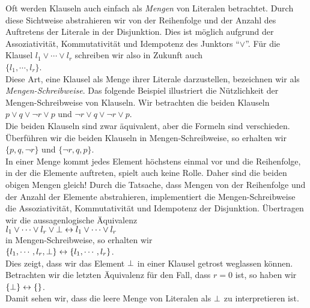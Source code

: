 Oft werden Klauseln auch einfach als \emph{\color{blue}Mengen} von Literalen betrachtet.  
Durch diese Sichtweise abstrahieren wir von der Reihenfolge und der Anzahl des Auftretens
der Literale in der Disjunktion.  Dies ist m\"{o}glich aufgrund der Assoziativit\"{a}t, Kommutativit\"{a}t und
Idempotenz des Junktors ``$\vee$''.  F\"{u}r die Klausel $l_1 \vee \cdots \vee l_r$ schreiben
wir also in Zukunft auch 
\\[0.2cm]
\hspace*{1.3cm} $\{ l_1, \cdots, l_r \}$.
\\[0.2cm]
Diese Art, eine Klausel als Menge ihrer Literale darzustellen, bezeichnen wir als
\emph{\color{blue}Mengen-Schreibweise}.  
Das folgende Beispiel illustriert die N\"{u}tzlichkeit der Mengen-Schreibweise von Klauseln.
Wir betrachten die beiden Klauseln
\\[0.2cm]
\hspace*{1.3cm}
$p \vee q \vee \neg r \vee p$ \quad und \quad $\neg r \vee q \vee \neg r \vee p$. 
\\[0.2cm]
Die beiden Klauseln sind zwar \"{a}quivalent, aber die Formeln sind verschieden.
\"{U}berf\"{u}hren wir die beiden Klauseln in Mengen-Schreibweise, so erhalten wir
\\[0.2cm]
\hspace*{1.3cm}
$\{p, q, \neg r \}$ \quad und \quad $\{ \neg r, q, p \}$. 
\\[0.2cm]
In einer Menge kommt jedes Element h\"{o}chstens einmal vor und die Reihenfolge, in der die
Elemente auftreten, spielt auch keine Rolle.  Daher sind die beiden obigen Mengen gleich!
Durch die Tatsache, dass Mengen von der Reihenfolge und der Anzahl der Elemente
abstrahieren, implementiert die Mengen-Schreibweise die Assoziativit\"{a}t, Kommutativit\"{a}t und
Idempotenz der Disjunktion.  \"{U}ber\-tragen wir die  aussagenlogische \"{A}quivalenz
\\[0.2cm]
\hspace*{1.3cm}
$l_1 \vee \cdots \vee l_r \vee \bot \leftrightarrow l_1 \vee \cdots \vee l_r$
\\[0.2cm]
in Mengen-Schreibweise, so erhalten wir
\\[0.2cm]
\hspace*{1.3cm}
$\{ l_1, \cdots, l_r, \bot \} \leftrightarrow \{ l_1, \cdots, l_r \}$.
\\[0.2cm]
Dies zeigt, dass wir das Element $\bot$ in einer Klausel getrost weglassen k\"{o}nnen.
Betrachten wir die letzten \"{A}quivalenz f\"{u}r den Fall, dass $r=0$ ist, so haben wir
\\[0.2cm]
\hspace*{1.3cm}
$\{\bot \} \leftrightarrow \{\}$.
\\[0.2cm]
Damit sehen wir, dass die leere Menge von Literalen als $\bot$ zu interpretieren ist.

